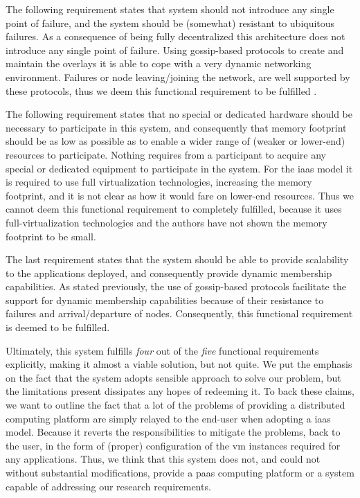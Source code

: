 \documentclass[12pt, titlepage]{uo_temp}
\begin{document}
     The following requirement states that system should not introduce any single point of
     failure, and the system should be (somewhat) resistant to ubiquitous failures.  As a
     consequence of being fully decentralized this architecture does not introduce any
     single point of failure. Using gossip-based protocols to create and maintain the
     overlays it is able to cope with a very dynamic networking environment. Failures or
     node leaving/joining the network, are well supported by these protocols, thus we deem
     this functional requirement to be fulfilled \cite{p2p_collab}.

     The following requirement states that no special or dedicated hardware should be
     necessary to participate in this system, and consequently that memory footprint
     should be as low as possible as to enable a wider range of (weaker or lower-end)
     resources to participate. Nothing requires from a participant to acquire any special
     or dedicated equipment to participate in the system. For the \gls{iaas} model it is
     required to use full virtualization technologies, increasing the memory footprint,
     and it is not clear as how it would fare on lower-end resources. Thus we cannot deem
     this functional requirement to completely fulfilled, because it uses
     full-virtualization technologies and the authors have not shown the memory footprint
     to be small.

     The last requirement states that the system should be able to provide scalability to
     the applications deployed, and consequently provide dynamic membership capabilities.
     As stated previously, the use of gossip-based protocols facilitate the support for
     dynamic membership capabilities because of their resistance to failures and
     arrival/departure of nodes. Consequently, this functional requirement is deemed to be
     fulfilled.

     Ultimately, this system fulfills \emph{four} out of the \emph{five} functional
     requirements explicitly, making it almost a viable solution, but not quite. We put
     the emphasis on the fact that the system adopts sensible approach to solve our
     problem, but the limitations present dissipates any hopes of redeeming it. To back
     these claims, we want to outline the fact that a lot of the problems of providing a
     distributed computing platform are simply relayed to the end-user when adopting a
     \gls{iaas} model. Because it reverts the responsibilities to mitigate the problems,
     back to the user, in the form of (proper) configuration of the \gls{vm} instances
     required for any applications. Thus, we think that this system does not, and could
     not without substantial modifications, provide a \gls{paas} computing platform or a
     system capable of addressing our research requirements.
     
\end{document}
